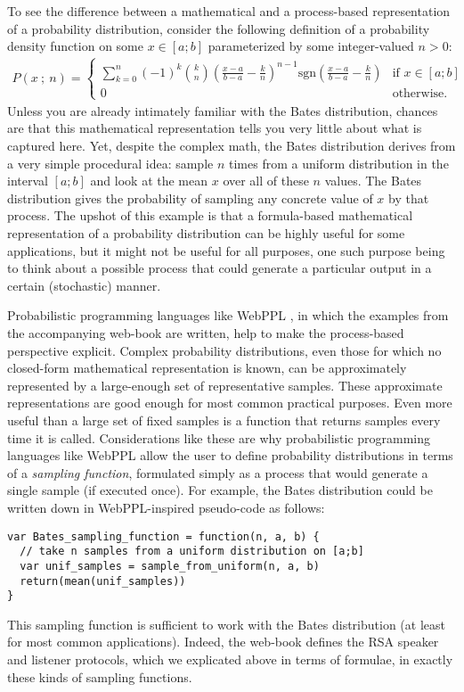 \documentclass[10pt,letterpaper]{article}
\begin{document}
To see the difference between a mathematical and a process-based representation of a probability distribution, consider the following definition of a probability density function on some $x \in [a;b]$ parameterized by some integer-valued $n>0$:
\begin{align*}
  P(x \ ; \ n) =
  \begin{cases}
    \sum_{k=0}^{n}(-1)^{k}\binom{k}{n} \left( \frac{x-a}{b-a} - \frac{k}{n} \right)^{n-1} \textrm{sgn} \left( \frac{x-a}{b-a} - \frac{k}{n} \right) & \text{if } x \in [a;b]\\
    0 & \text{otherwise}.
  \end{cases}
\end{align*}
Unless you are already intimately familiar with the Bates distribution, chances are that this mathematical representation tells you very little about what is captured here.
Yet, despite the complex math, the Bates distribution derives from a very simple procedural idea:
sample $n$ times from a uniform distribution in the interval $[a;b]$ and look at the mean $x$ over all of these $n$ values.
The Bates distribution gives the probability of sampling any concrete value of $x$ by that process.
The upshot of this example is that a formula-based mathematical representation of a probability distribution can be highly useful for some applications, but it might not be useful for all purposes, one such purpose being to think about a possible process that could generate a particular output in a certain (stochastic) manner.

Probabilistic programming languages like WebPPL \cite{goodmanstuhlmuller2014}, in which the examples from the accompanying web-book are written, help to make the process-based perspective explicit.
Complex probability distributions, even those for which no closed-form mathematical representation is known, can be approximately represented by a large-enough set of representative samples.
These approximate representations are good enough for most common practical purposes.
Even more useful than a large set of fixed samples is a function that returns samples every time it is called.
Considerations like these are why probabilistic programming languages like WebPPL allow the user to define probability distributions in terms of a \emph{sampling function}, formulated simply as a process that would generate a single sample (if executed once).
For example, the Bates distribution could be written down in WebPPL-inspired pseudo-code as follows: 
\begin{lstlisting}
var Bates_sampling_function = function(n, a, b) {
  // take n samples from a uniform distribution on [a;b]
  var unif_samples = sample_from_uniform(n, a, b)
  return(mean(unif_samples))
}
\end{lstlisting}
This sampling function is sufficient to work with the Bates distribution (at least for most common applications).
Indeed, the web-book defines the RSA speaker and listener protocols, which we explicated above in terms of formulae, in exactly these kinds of sampling functions.
\end{document}
